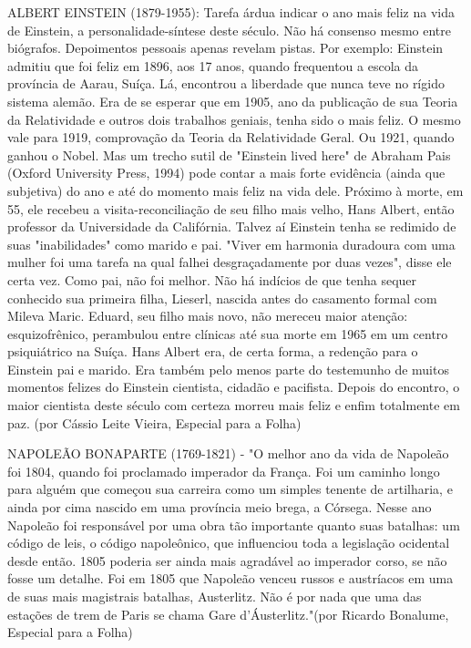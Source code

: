 ALBERT EINSTEIN (1879-1955): Tarefa árdua indicar o ano mais feliz na vida de Einstein, a personalidade-síntese deste século. Não há consenso mesmo entre biógrafos. Depoimentos pessoais apenas revelam pistas. Por exemplo: Einstein admitiu que foi feliz em 1896, aos 17 anos, quando frequentou a escola da província de Aarau, Suíça. Lá, encontrou a liberdade que nunca teve no rígido sistema alemão. Era de se esperar que em 1905, ano da publicação de sua Teoria da Relatividade e outros dois trabalhos geniais, tenha sido o mais feliz. O mesmo vale para 1919, comprovação da Teoria da Relatividade Geral. Ou 1921, quando ganhou o Nobel. Mas um trecho sutil de "Einstein lived here" de Abraham Pais (Oxford University Press, 1994) pode contar a mais forte evidência (ainda que subjetiva) do ano e até do momento mais feliz na vida dele. Próximo à morte, em 55, ele recebeu a visita-reconciliação de seu filho mais velho, Hans Albert, então professor da Universidade da Califórnia. Talvez aí Einstein tenha se redimido de suas "inabilidades" como marido e pai. "Viver em harmonia duradoura com uma mulher foi uma tarefa na qual falhei desgraçadamente por duas vezes", disse ele certa vez. Como pai, não foi melhor. Não há indícios de que tenha sequer conhecido sua primeira filha, Lieserl, nascida antes do casamento formal com Mileva Maric. Eduard, seu filho mais novo, não mereceu maior atenção: esquizofrênico, perambulou entre clínicas até sua morte em 1965 em um centro psiquiátrico na Suíça. Hans Albert era, de certa forma, a redenção para o Einstein pai e marido. Era também pelo menos parte do testemunho de muitos momentos felizes do Einstein cientista, cidadão e pacifista. Depois do encontro, o maior cientista deste século com certeza morreu mais feliz e enfim totalmente em paz. (por Cássio Leite Vieira, Especial para a Folha)

NAPOLEÃO BONAPARTE (1769-1821) - "O melhor ano da vida de Napoleão foi 1804, quando foi proclamado imperador da França. Foi um caminho longo para alguém que começou sua carreira como um simples tenente de artilharia, e ainda por cima nascido em uma província meio brega, a Córsega. Nesse ano Napoleão foi responsável por uma obra tão importante quanto suas batalhas: um código de leis, o código napoleônico, que influenciou toda a legislação ocidental desde então. 1805 poderia ser ainda mais agradável ao imperador corso, se não fosse um detalhe. Foi em 1805 que Napoleão venceu russos e austríacos em uma de suas mais magistrais batalhas, Austerlitz. Não é por nada que uma das estações de trem de Paris se chama Gare d'Áusterlitz."(por Ricardo Bonalume, Especial para a Folha)

